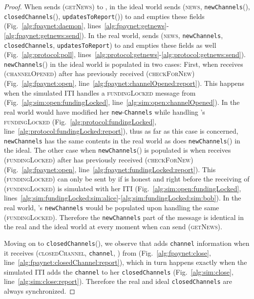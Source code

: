 \begin{proof}
  When \environment{} sends (\textsc{getNews}) to \alice, in the ideal world
  \fpaynet{} sends (\textsc{news}, \texttt{newChannels}(\alice),
  \texttt{closedChannels}(\alice), \texttt{updatesToReport}\linebreak(\alice))
  to \environment{} and empties these fields (Fig.~\ref{alg:fpaynet:daemon},
  lines~\ref{alg:fpaynet:getnews}-\ref{alg:fpaynet:getnews:send}). In the real
  world, \alice{} sends (\textsc{news}, \texttt{newChannels},
  \texttt{closedChannels}, \texttt{updatesToReport}) to \environment{} and
  empties these fields as well (Fig.~\ref{alg:protocol:poll},
  lines~\ref{alg:protocol:getnews}-\ref{alg:protocol:getnews:send}).
  \texttt{newChannels}(\alice) in the ideal world is populated in two cases:
  First, when \fpaynet{} receives (\textsc{channelOpened}) after \alice{} has
  previously received (\textsc{checkForNew}) (Fig.~\ref{alg:fpaynet:open},
  line~\ref{alg:fpaynet:channelOpened:report}). This happens when the simulated
  \alice{} ITI handles a \textsc{fundingLocked} message from \bob{}
  (Fig.~\ref{alg:sim:open:fundingLocked},
  line~\ref{alg:sim:open:channelOpened}). In the real world \alice{} would have
  modified her \texttt{new}-\linebreak\texttt{Channels} while handling \bob's
  \textsc{fundingLocked} (Fig.~\ref{alg:protocol:fundingLocked},
  line~\ref{alg:protocol:fundingLocked:report}), thus as far as this case is
  concerned, \texttt{newChannels} has the same contents in the real world as
  does \texttt{newChannels}(\alice) in the ideal. The other case when
  \texttt{newChannels}(\alice) is populated is when \fpaynet{} receives
  (\textsc{fundingLocked}) after \bob{} has previously received
  (\textsc{checkForNew}) (Fig.~\ref{alg:fpaynet:open},
  line~\ref{alg:fpaynet:fundingLocked:report}). This (\textsc{fundingLocked})
  can only be sent by \simulator{} if \alice{} is honest and right before the
  receiving of (\textsc{fundingLocked}) is simulated with her ITI
  (Fig.~\ref{alg:sim:open:fundingLocked},
  lines~\ref{alg:sim:fundingLocked:sim:alice}-\ref{alg:sim:fundingLocked:sim:bob}).
  In the real world, \alice's \texttt{newChannels} would be populated upon
  handling the same (\textsc{fundingLocked}). Therefore the \texttt{newChannels}
  part of the message is identical in the real and the ideal world at every
  moment when \environment{} can send (\textsc{getNews}).

  Moving on to \texttt{closedChannels}(\alice), we observe that \fpaynet{} adds
  \texttt{channel} information when it receives (\textsc{closedChannel},
  \texttt{channel}, \alice) from \simulator{} (Fig.~\ref{alg:fpaynet:close},
  line~\ref{alg:fpaynet:closedChannel:report}), which in turn happens exactly
  when the simulated \alice{} ITI adds the \texttt{channel} to her
  \texttt{closedChannels} (Fig.~\ref{alg:sim:close},
  line~\ref{alg:sim:close:report}). Therefore the real and ideal
  \texttt{closedChannels} are always synchronized.


\end{proof}
